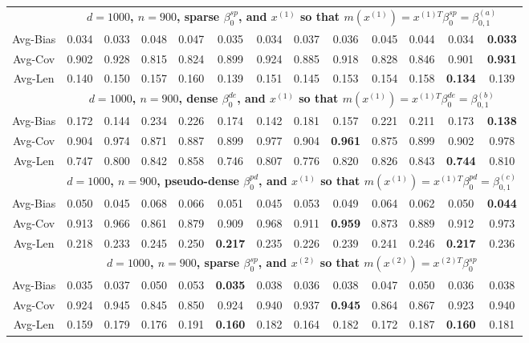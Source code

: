 \documentclass[ejsv2,noshowframe]{imsart}
\theoremstyle{plain}
\theoremstyle{definition}
\theoremstyle{remark}
\begin{document}
\begin{table}[hbtp!]
\begin{center}
{\begin{tabular}{ccccccccccccc}
				\cline{1-13}
				& \multicolumn{12}{c}{\bf $d=1000$, $n = 900$, sparse $\beta_0^{sp}$, and $x^{(1)}$ so that $m(x^{(1)})=x^{(1)T}\beta_0^{sp} = \beta_{0,1}^{(a)}$} \\ \cline{2-13}
				Avg-Bias & 0.034 & 0.033 & 0.048 & 0.047 & 0.035 & 0.034 & 0.037 & 0.036 & 0.045 & 0.044 & 0.034 & {\bf 0.033} \\
				Avg-Cov & 0.902 & 0.928 & 0.815 & 0.824 & 0.899 & 0.924 & 0.885 & 0.918 & 0.828 & 0.846 & 0.901 & {\bf 0.931} \\
				Avg-Len & 0.140 & 0.150 & 0.157 & 0.160 & 0.139 & 0.151 & 0.145 & 0.153 & 0.154 & 0.158 & {\bf 0.134} & 0.139 \\
				\cline{2-13}
				
				& \multicolumn{12}{c}{\bf $d=1000$, $n = 900$, dense $\beta_0^{de}$, and $x^{(1)}$ so that $m(x^{(1)})=x^{(1)T}\beta_0^{de} = \beta_{0,1}^{(b)}$} \\ \cline{2-13}
				Avg-Bias & 0.172 & 0.144 & 0.234 & 0.226 & 0.174 & 0.142 & 0.181 & 0.157 & 0.221 & 0.211 & 0.173 & {\bf 0.138} \\
				Avg-Cov & 0.904 & 0.974 & 0.871 & 0.887 & 0.899 & 0.977 & 0.904 & {\bf 0.961} & 0.875 & 0.899 & 0.902 & 0.978 \\
				Avg-Len & 0.747 & 0.800 & 0.842 & 0.858 & 0.746 & 0.807 & 0.776 & 0.820 & 0.826 & 0.843 & {\bf 0.744} & 0.810 \\
				\cline{2-13}
				
				& \multicolumn{12}{c}{\bf $d=1000$, $n = 900$, pseudo-dense $\beta_0^{pd}$, and $x^{(1)}$ so that $m(x^{(1)})=x^{(1)T}\beta_0^{pd} = \beta_{0,1}^{(c)}$} \\ \cline{2-13}	
				Avg-Bias & 0.050 & 0.045 & 0.068 & 0.066 & 0.051 & 0.045 & 0.053 & 0.049 & 0.064 & 0.062 & 0.050 & {\bf 0.044} \\
				Avg-Cov & 0.913 & 0.966 & 0.861 & 0.879 & 0.909 & 0.968 & 0.911 & {\bf 0.959} & 0.873 & 0.889 & 0.912 & 0.973 \\
				Avg-Len & 0.218 & 0.233 & 0.245 & 0.250 & {\bf 0.217} & 0.235 & 0.226 & 0.239 & 0.241 & 0.246 & {\bf 0.217} & 0.236 \\
				\hline
				
				& \multicolumn{12}{c}{\bf $d=1000$, $n = 900$, sparse $\beta_0^{sp}$, and $x^{(2)}$ so that $m(x^{(2)})=x^{(2)T}\beta_0^{sp}$} \\ \cline{2-13}
				Avg-Bias & 0.035 & 0.037 & 0.050 & 0.053 & {\bf 0.035} & 0.038 & 0.036 & 0.038 & 0.047 & 0.050 & 0.036 & 0.038 \\
				Avg-Cov & 0.924 & 0.945 & 0.845 & 0.850 & 0.924 & 0.940 & 0.937 & {\bf 0.945} & 0.864 & 0.867 & 0.923 & 0.940 \\
				Avg-Len & 0.159 & 0.179 & 0.176 & 0.191 & {\bf 0.160} & 0.182 & 0.164 & 0.182 & 0.172 & 0.187 & {\bf 0.160} & 0.181 \\
				\cline{2-13}
				

\end{tabular}}
\end{center}
\end{table}
\end{document}
